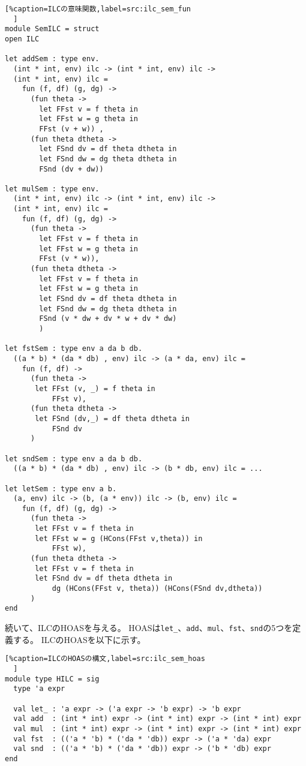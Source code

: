 \documentclass[uplatex]{sumiilab-paper}
\theoremstyle{mystyle}
\numberwithin{definition}{chapter} %
\begin{document}
\begin{lstlisting}[%caption=ILCの意味関数,label=src:ilc_sem_fun
  ]
module SemILC = struct
open ILC

let addSem : type env. 
  (int * int, env) ilc -> (int * int, env) ilc -> 
  (int * int, env) ilc =
    fun (f, df) (g, dg) -> 
      (fun theta -> 
        let FFst v = f theta in 
        let FFst w = g theta in 
        FFst (v + w)) , 
      (fun theta dtheta -> 
        let FSnd dv = df theta dtheta in 
        let FSnd dw = dg theta dtheta in 
        FSnd (dv + dw))

let mulSem : type env. 
  (int * int, env) ilc -> (int * int, env) ilc -> 
  (int * int, env) ilc = 
    fun (f, df) (g, dg) -> 
      (fun theta -> 
        let FFst v = f theta in 
        let FFst w = g theta in 
        FFst (v * w)),
      (fun theta dtheta -> 
        let FFst v = f theta in 
        let FFst w = g theta in
        let FSnd dv = df theta dtheta in 
        let FSnd dw = dg theta dtheta in 
        FSnd (v * dw + dv * w + dv * dw) 
        )

let fstSem : type env a da b db. 
  ((a * b) * (da * db) , env) ilc -> (a * da, env) ilc = 
    fun (f, df) -> 
      (fun theta -> 
       let FFst (v, _) = f theta in 
           FFst v), 
      (fun theta dtheta -> 
       let FSnd (dv,_) = df theta dtheta in
           FSnd dv  
      )

let sndSem : type env a da b db. 
  ((a * b) * (da * db) , env) ilc -> (b * db, env) ilc = ...

let letSem : type env a b. 
  (a, env) ilc -> (b, (a * env)) ilc -> (b, env) ilc = 
    fun (f, df) (g, dg) -> 
      (fun theta -> 
       let FFst v = f theta in 
       let FFst w = g (HCons(FFst v,theta)) in 
           FFst w), 
      (fun theta dtheta -> 
       let FFst v = f theta in 
       let FSnd dv = df theta dtheta in 
           dg (HCons(FFst v, theta)) (HCons(FSnd dv,dtheta))
      )
end 
\end{lstlisting}

続いて、ILCのHOASを与える。
HOASは{\tt let\_}、{\tt add}、{\tt mul}、{\tt fst}、{\tt snd}の5つを定義する。
ILCのHOASを以下に示す。

\begin{lstlisting}[%caption=ILCのHOASの構文,label=src:ilc_sem_hoas
  ]
module type HILC = sig 
  type 'a expr 

  val let_ : 'a expr -> ('a expr -> 'b expr) -> 'b expr 
  val add  : (int * int) expr -> (int * int) expr -> (int * int) expr 
  val mul  : (int * int) expr -> (int * int) expr -> (int * int) expr 
  val fst  : (('a * 'b) * ('da * 'db)) expr -> ('a * 'da) expr 
  val snd  : (('a * 'b) * ('da * 'db)) expr -> ('b * 'db) expr
end 
\end{lstlisting}
\end{document}
